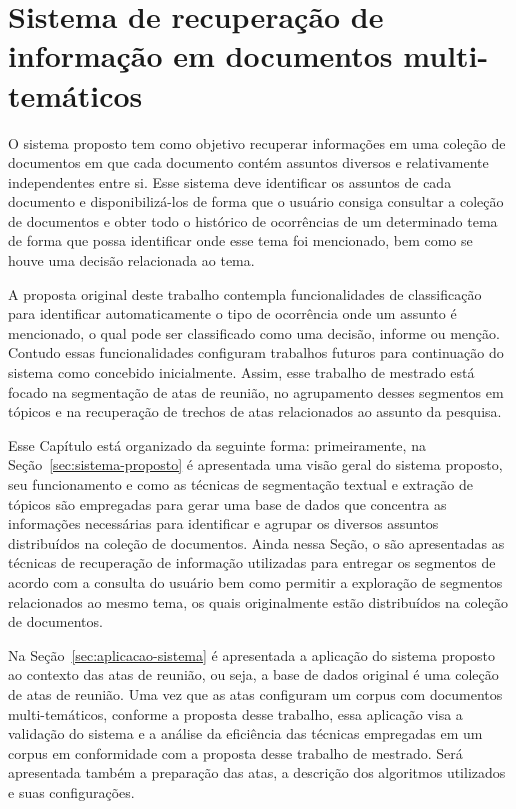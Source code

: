 \chapter{Sistema de recuperação de informação em documentos multi-temáticos}
\label{cap3}


O sistema proposto tem como objetivo recuperar informações em uma coleção de documentos em que cada documento contém assuntos diversos e relativamente independentes entre si. Esse sistema deve identificar os assuntos de cada documento e disponibilizá-los de forma que o usuário consiga consultar a coleção de documentos e obter todo o histórico de ocorrências de um determinado tema de forma que possa identificar onde esse tema foi mencionado, bem como se houve uma decisão relacionada ao tema.

A proposta original deste trabalho contempla funcionalidades de classificação para identificar automaticamente o tipo de ocorrência onde um assunto é mencionado, o qual pode ser classificado como uma decisão, informe ou menção. Contudo essas funcionalidades configuram trabalhos futuros para continuação do sistema como concebido inicialmente. Assim, esse trabalho de mestrado está focado na segmentação de atas de reunião, no agrupamento desses segmentos em tópicos e na recuperação de trechos de atas relacionados ao assunto da pesquisa.

Esse Capítulo está organizado da seguinte forma: primeiramente, na Seção~\ref{sec:sistema-proposto} é apresentada uma visão geral do sistema proposto, seu funcionamento e como as técnicas de segmentação textual e extração de tópicos são empregadas para gerar uma base de dados que concentra as informações necessárias para identificar e agrupar os diversos assuntos distribuídos na coleção de documentos. Ainda nessa Seção, o são apresentadas as técnicas de recuperação de informação utilizadas para entregar os segmentos de acordo com a consulta do usuário bem como permitir a exploração de segmentos relacionados ao mesmo tema, os quais originalmente estão distribuídos na coleção de documentos.

Na Seção~\ref{sec:aplicacao-sistema} é apresentada a aplicação do sistema proposto ao contexto das atas de reunião, ou seja, a base de dados original é uma coleção de atas de reunião. Uma vez que as atas configuram um corpus com documentos multi-temáticos, conforme a proposta desse trabalho, essa aplicação visa a validação do sistema e a análise da eficiência das técnicas empregadas em um corpus em conformidade com a proposta desse trabalho de mestrado. Será apresentada também a preparação das atas, a descrição dos algoritmos utilizados e suas configurações.

